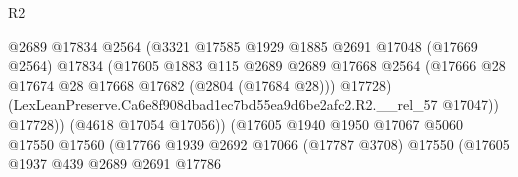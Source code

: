 \begin{lexlean}{R2}
\begin{coremodule}
                                            @2689
                                            @17834
                                            @2564
                                            (@3321
                                              @17585
                                              @1929
                                              @1885
                                              @2691
                                              @17048
                                              (@17669 @2564)
                                              @17834
                                              (@17605
                                                @1883
                                                @115
                                                @2689
                                                @2689
                                                @17668
                                                @2564
                                                (@17666
                                                  @28
                                                  @17674
                                                  @28
                                                  @17668
                                                  @17682
                                                  (@2804 (@17684 @28)))
                                                @17728)
                                              (LexLeanPreserve.Ca6e8f908dbad1ec7bd55ea9d6be2afc2.R2.__rel_57
                                                @17047))
                                            @17728))
                                        (@4618 @17054 @17056))
                                      (@17605
                                        @1940
                                        @1950
                                        @17067
                                        @5060
                                        @17550
                                        @17560
                                        (@17766
                                          @1939
                                          @2692
                                          @17066
                                          (@17787 @3708)
                                          @17550
                                          (@17605
                                            @1937
                                            @439
                                            @2689
                                            @2691
                                            @17786

\end{coremodule}
\end{lexlean}
